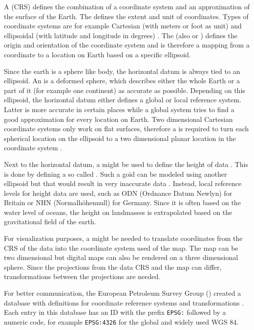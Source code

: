 		A  (CRS) defines the combination of a coordinate system and an approximation of the surface of the Earth.
		The  defines the extent and unit of coordinates.
		Types of coordinate systems are for example Cartesian (with meters or foot as unit) and ellipsoidal (with latitude and longitude in degrees) \cite[11-13]{ordenance-survey-booklet}.
		The  (also  or ) defines the origin and orientation of the coordinate system and is therefore a mapping from a coordinate to a location on Earth based on a specific ellipsoid.
		
		Since the earth is a sphere like body, the horizontal datum is always tied to an ellipsoid.
		An  is a deformed sphere, which describes either the whole Earth or a part of it (for example one continent) as accurate as possible.
		Depending on this ellipsoid, the horizontal datum either defines a global or local reference system.
		Latter is more accurate in certain places while a global system tries to find a good approximation for every location on Earth.
		Two dimensional Cartesian coordinate systems only work on flat surfaces, therefore a  is required to turn each spherical location on the ellipsoid to a two dimensional planar location in the coordinate system \cite[17]{ordenance-survey-booklet}.
		
		Next to the horizontal datum, a  might be used to define the height of data \cite[9-10]{ordenance-survey-booklet}.
		This is done by defining a so called .
		Such a goid can be modeled using another ellipsoid but that would result in very inaccurate data \cite[10]{ordenance-survey-booklet}.
		Instead, local reference levels for height data are used, such as ODN (Ordnance Datum Newlyn) for Britain or NHN (Normalhöhennull) for Germany.
		Since it is often based on the water level of oceans, the height on landmasses is extrapolated based on the gravitational field of the earth.
		
		For visualization purposes, a  might be needed to translate coordinates from the CRS of the data into the coordinate system used of the map.
		The map can be two dimensional but digital maps can also be rendered on a three dimensional sphere.
		Since the projections from the data CRS and the map can differ, transformations between the projections are needed.
		
		For better communication, the European Petroleum Survey Group () created a database with definitions for coordinate reference systems and transformations \cite{epsg}.
		Each entry in this database has an ID with the prefix \texttt{EPSG:} followed by a numeric code, for example \texttt{EPSG:4326} for the global and widely used WGS 84.
		
